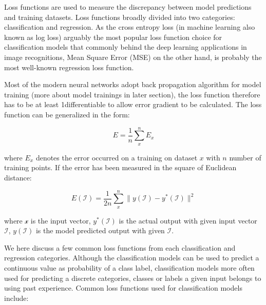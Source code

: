 Loss functions are used to measure the discrepancy between model predictions and training datasets. Loss functions broadly divided into two categories: classification and regression. As the cross entropy loss (in machine learning also known as log loss) arguably the most popular loss function choice for classification models that commonly behind the deep learning applications in image recognitions, Mean Square Error (MSE) on the other hand, is probably the most well-known regression loss function. 
\par 
Most of the modern neural networks adopt back propagation algorithm for model training (more about model trainings in later section), the loss function therefore has to be at least 1\textdegree differentiable to allow error gradient to be calculated. The loss function can be generalized in the form:

\begin{equation}
    E = \frac {1}{n} \sum_x^n E_x
\end{equation}

where $E_x$ denotes the error occurred on a training on dataset $x$ with $n$ number of training points. If the error has been measured in the square of Euclidean distance:

\begin{equation}
    E(\mathcal{I}) = \frac {1}{2n} \sum_x^n \parallel y(\mathcal{I}) - y^*(\mathcal{I}) \parallel^2 
\end{equation}

where $\mathcal{x}$ is the input vector, $y^*(\mathcal{I})$ is the actual output with given input vector $\mathcal{I}$, $y(\mathcal{I})$ is the model predicted output with given $\mathcal{I}$. 
\par 
We here discuss a few common loss functions from each classification and regression categories. Although the classification models can be used to predict a continuous value as probability of a class label, classification models more often used for predicting a discrete categories, classes or labels a given input belongs to using past experience. Common loss functions used for classification models include:

